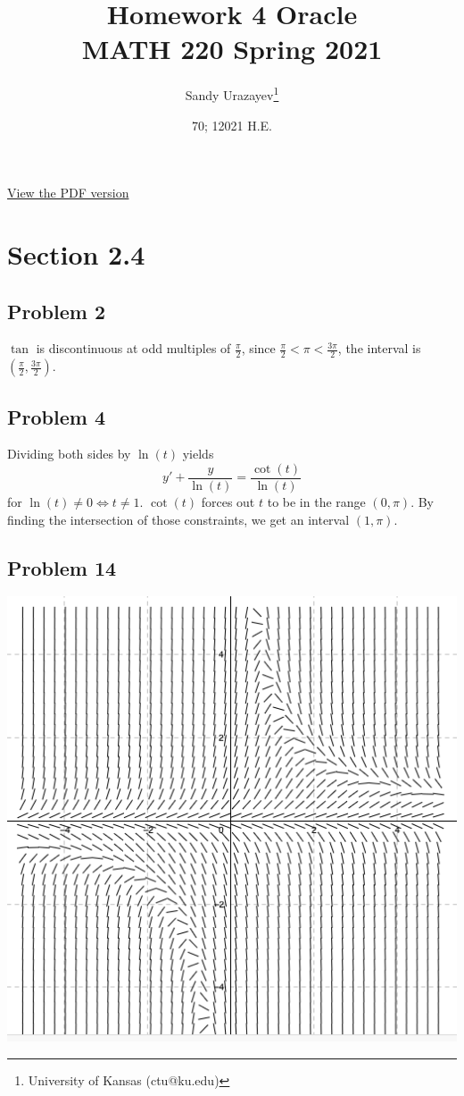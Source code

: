 \documentclass[12pt]{article}
\author{Sandy Urazayev\thanks{University of Kansas (ctu@ku.edu)}}
\date{70; 12021 H.E.}
\title{Homework 4 Oracle\\\medskip
\large MATH 220 Spring 2021}
\begin{document}
\maketitle
\href{./index.pdf}{View the PDF version​}

\section*{Section 2.4}
\label{sec:orgb78bdb8}

\subsection*{Problem 2}
\label{sec:org28ffbea}
\(\tan\) is discontinuous at odd multiples of \(\frac{\pi}{2}\), since
\(\frac{\pi}{2} < \pi < \frac{3\pi}{2}\), the interval is
\((\frac{\pi}{2}, \frac{3\pi}{2})\).

\subsection*{Problem 4}
\label{sec:org13bc117}
Dividing both sides by \(\ln(t)\) yields
\begin{equation*}
  y' + \frac{y}{\ln(t)} = \frac{\cot(t)}{\ln(t)}
\end{equation*}
for \(\ln(t) \neq 0 \iff t \neq 1\). \(\cot(t)\) forces out \(t\) to be in the
range \((0, \pi)\). By finding the intersection of those constraints, we get an
interval \((1, \pi)\).

\subsection*{Problem 14}
\label{sec:org19710c4}
\begin{center}
\includegraphics[width=.9\linewidth]{./14.png}
\end{center}
\end{document}

